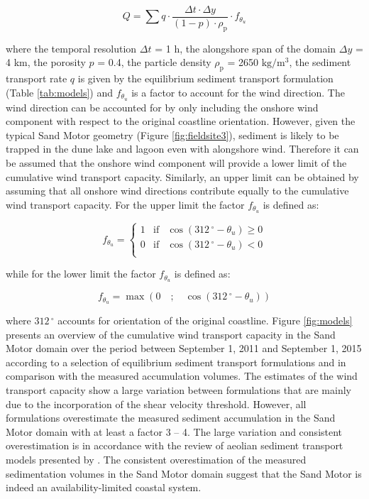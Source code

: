 \begin{equation}
  \label{eq:transport_capacity}
  Q = \sum q \cdot \frac{\Delta t \cdot \Delta y}{(1 - p) \cdot \rho_{\mathrm{p}}} \cdot f_{\theta_u}
\end{equation}

\noindent where the temporal resolution $\Delta t$ = 1 h, the
alongshore span of the domain $\Delta y$ = 4 km, the porosity $p$ =
0.4, the particle density $\rho_{\mathrm{p}}$ = 2650
$\mathrm{kg/m^3}$, the sediment transport rate $q$ is given by the
equilibrium sediment transport formulation (Table \ref{tab:models})
and $f_{\theta_u}$ is a factor to account for the wind direction. The
wind direction can be accounted for by only including the onshore wind
component with respect to the original coastline orientation. However,
given the typical Sand Motor geometry (Figure \ref{fig:fieldsite3}),
sediment is likely to be trapped in the dune lake and lagoon even with
alongshore wind. Therefore it can be assumed that the onshore wind
component will provide a lower limit of the cumulative wind transport
capacity. Similarly, an upper limit can be obtained by assuming that
all onshore wind directions contribute equally to the cumulative wind
transport capacity. For the upper limit the factor $f_{\theta_u}$ is
defined as:

\begin{equation}
  f_{\theta_u} = \left\{
      \begin{array}{rcl}
        1 & \mathrm{if} & \cos \left( 312\,^{\circ} - \theta_u \right) \geq 0 \\
        0 & \mathrm{if} & \cos \left( 312\,^{\circ} - \theta_u \right) < 0 \\
      \end{array}
    \right.
\end{equation}

\noindent while for the lower limit the factor $f_{\theta_u}$ is defined
as:

\begin{equation}
  f_{\theta_u} = \max \left( 0 \quad ; \quad \cos \left( 312\,^{\circ} - \theta_u \right) \right)
\end{equation}

\noindent where $312\,^{\circ}$ accounts for orientation of the original
coastline.  Figure \ref{fig:models} presents an overview of the
cumulative wind transport capacity in the Sand Motor domain over the
period between September 1, 2011 and September 1, 2015 according to a
selection of equilibrium sediment transport formulations and in
comparison with the measured accumulation volumes. The estimates of
the wind transport capacity show a large variation between
formulations that are mainly due to the incorporation of the shear
velocity threshold. However, all formulations overestimate the
measured sediment accumulation in the Sand Motor domain with at least
a factor 3 -- 4. The large variation and consistent overestimation is
in accordance with the review of aeolian sediment transport models
presented by \citet{Sherman2012}. The consistent overestimation of the
measured sedimentation volumes in the Sand Motor domain suggest that
the Sand Motor is indeed an availability-limited coastal system.

